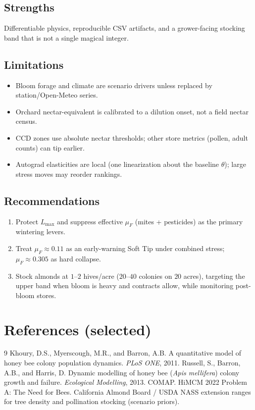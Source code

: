 \documentclass[12pt]{article}
\newcommand{\Lmax}{L_{\max}}
\newcommand{\muF}{\mu_{F}}
\begin{document}
\subsection{Strengths}
Differentiable physics, reproducible CSV artifacts, and a grower-facing
stocking band that is not a single magical integer.

\subsection{Limitations}
\begin{itemize}[leftmargin=1.4em]
  \item Bloom forage and climate are scenario drivers unless replaced by
        station/Open-Meteo series.
  \item Orchard nectar-equivalent is calibrated to a dilution onset, not
        a field nectar census.
  \item CCD zones use absolute nectar thresholds; other store metrics
        (pollen, adult counts) can tip earlier.
  \item Autograd elasticities are local (one linearization about the
        baseline \(\theta\)); large stress moves may reorder rankings.
\end{itemize}

\subsection{Recommendations}
\begin{enumerate}[leftmargin=1.4em]
  \item Protect \(\Lmax\) and suppress effective \(\muF\) (mites +
        pesticides) as the primary wintering levers.
  \item Treat \(\muF\approx 0.11\) as an early-warning Soft Tip under
        combined stress; \(\muF\approx 0.305\) as hard collapse.
  \item Stock almonds at \(1\)--\(2\) hives/acre (\(20\)--\(40\) colonies
        on \(20\) acres), targeting the upper band when bloom is heavy
        and contracts allow, while monitoring post-bloom stores.
\end{enumerate}

\section*{References (selected)}
\begin{thebibliography}{9}
 Khoury, D.S., Myerscough, M.R., and Barron, A.B.
A quantitative model of honey bee colony population dynamics.
\emph{PLoS ONE}, 2011.
 Russell, S., Barron, A.B., and Harris, D.
Dynamic modelling of honey bee (\emph{Apis mellifera}) colony growth and
failure. \emph{Ecological Modelling}, 2013.
 COMAP. HiMCM 2022 Problem A: The Need for Bees.
 California Almond Board / USDA NASS extension ranges for
tree density and pollination stocking (scenario priors).
\end{thebibliography}
\end{document}
